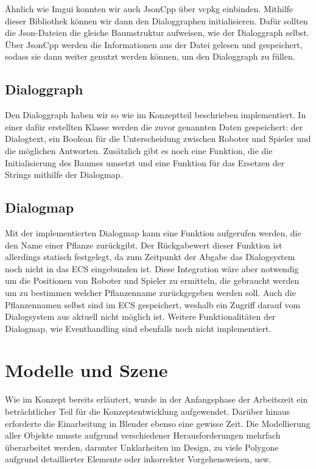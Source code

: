 Ähnlich wie Imgui konnten wir auch JsonCpp über vcpkg einbinden. Mithilfe dieser Bibliothek können wir dann den Dialoggraphen initialisieren. Dafür sollten die Json-Dateien die gleiche Baumstruktur aufweisen, wie der Dialoggraph selbst. Über JsonCpp werden die Informationen aus der Datei gelesen und gespeichert, sodass sie dann weiter genutzt werden können, um den Dialoggraph zu füllen.

\subsection{Dialoggraph}

Den Dialoggraph haben wir so wie im Konzeptteil beschrieben implementiert. In einer dafür erstellten Klasse werden die zuvor genannten Daten gespeichert: der Dialogtext, ein Boolean für die Unterscheidung zwischen Roboter und Spieler und die möglichen Antworten. Zusätzlich gibt es noch eine Funktion, die die Initialisierung des Baumes umsetzt und eine Funktion für das Ersetzen der Strings mithilfe der Dialogmap.

\subsection{Dialogmap}

Mit der implementierten Dialogmap kann eine Funktion aufgerufen werden, die den Name einer Pflanze zurückgibt. Der Rückgabewert dieser Funktion ist allerdings statisch festgelegt, da zum Zeitpunkt der Abgabe das Dialogsystem noch nicht in das ECS eingebunden ist. Diese Integration wäre aber notwendig um die Positionen von Roboter und Spieler zu ermitteln, die gebraucht werden um zu bestimmen welcher Pflanzenname zurückgegeben werden soll. Auch die Pflanzennamen selbst sind im ECS gespeichert, weshalb ein Zugriff darauf vom Dialogsystem aus aktuell nicht möglich ist.  
Weitere Funktionalitäten der Dialogmap, wie Eventhandling sind ebenfalls noch nicht implementiert.

\section{Modelle und Szene}

Wie im Konzept bereits erläutert, wurde in der Anfangsphase der Arbeitszeit ein beträchtlicher Teil für die Konzeptentwicklung aufgewendet. Darüber hinaus erforderte die Einarbeitung in Blender ebenso eine gewisse Zeit. Die Modellierung aller Objekte musste aufgrund verschiedener Herausforderungen mehrfach überarbeitet werden, darunter Unklarheiten im Design, zu viele Polygone aufgrund detaillierter Elemente oder inkorrekter Vorgehensweisen, usw.


